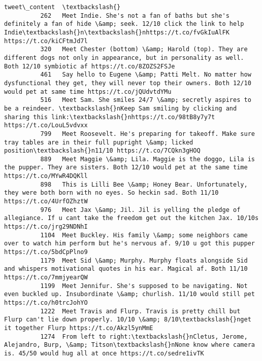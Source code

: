 \documentclass[11pt]{article}
\begin{document}
\begin{Verbatim}[commandchars=\\\{\}]
                                                                                                                                                                            tweet\_content  \textbackslash{}
          262   Meet Indie. She's not a fan of baths but she's definitely a fan of hide \&amp; seek. 12/10 click the link to help Indie\textbackslash{}n\textbackslash{}nhttps://t.co/fvGkIuAlFK https://t.co/kiCFtmJd7l   
          320   Meet Chester (bottom) \&amp; Harold (top). They are different dogs not only in appearance, but in personality as well. Both 12/10 symbiotic af https://t.co/8ZOZS2FSJe       
          461   Say hello to Eugene \&amp; Patti Melt. No matter how dysfunctional they get, they will never top their owners. Both 12/10 would pet at same time https://t.co/jQUdvtdYMu     
          516   Meet Sam. She smiles 24/7 \&amp; secretly aspires to be a reindeer. \textbackslash{}nKeep Sam smiling by clicking and sharing this link:\textbackslash{}nhttps://t.co/98tB8y7y7t https://t.co/LouL5vdvxx   
          799   Meet Roosevelt. He's preparing for takeoff. Make sure tray tables are in their full pupright \&amp; licked position\textbackslash{}n11/10 https://t.co/7CQkn3gHOQ                           
          889   Meet Maggie \&amp; Lila. Maggie is the doggo, Lila is the pupper. They are sisters. Both 12/10 would pet at the same time https://t.co/MYwR4DQKll                            
          898   This is Lilli Bee \&amp; Honey Bear. Unfortunately, they were both born with no eyes. So heckin sad. Both 11/10 https://t.co/4UrfOZhztW                                      
          976   Meet Jax \&amp; Jil. Jil is yelling the pledge of allegiance. If u cant take the freedom get out the kitchen Jax. 10/10s https://t.co/jrg29NDNhI                             
          1104  Meet Buckley. His family \&amp; some neighbors came over to watch him perform but he's nervous af. 9/10 u got this pupper https://t.co/5bdCpPlno9                            
          1179  Meet Sid \&amp; Murphy. Murphy floats alongside Sid and whispers motivational quotes in his ear. Magical af. Both 11/10 https://t.co/7mmjyearQW                              
          1199  Meet Jennifur. She's supposed to be navigating. Not even buckled up. Insubordinate \&amp; churlish. 11/10 would still pet https://t.co/h0trcJohYO                            
          1222  Meet Travis and Flurp. Travis is pretty chill but Flurp can't lie down properly. 10/10 \&amp; 8/10\textbackslash{}nget it together Flurp https://t.co/Akzl5ynMmE                            
          1274  From left to right:\textbackslash{}nCletus, Jerome, Alejandro, Burp, \&amp; Titson\textbackslash{}nNone know where camera is. 45/50 would hug all at once https://t.co/sedre1ivTK                          

\end{Verbatim}
\end{document}
